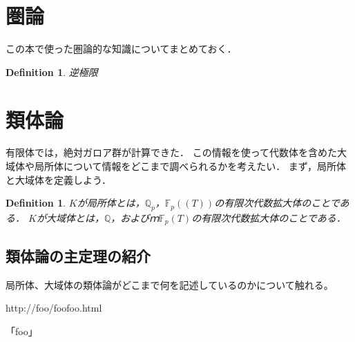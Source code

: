 \documentclass{ujarticle}
\newtheorem{dfn}[thm]{Definition}
\begin{document}
\section{圏論}
この本で使った圏論的な知識についてまとめておく．

\begin{dfn}
 逆極限
\end{dfn}


\section{類体論}
\label{sub:局所体体}
有限体では，絶対ガロア群が計算できた．
この情報を使って代数体を含めた大域体や局所体について情報をどこまで調べられるかを考えたい．
まず，局所体と大域体を定義しよう．

\begin{dfn}
 $K$が局所体とは，$\mathbb{Q}_p$，$\mathbb{F}_p((T))$の有限次代数拡大体のことである．
 $K$が大域体とは，$\mathbb{Q}$，およびｍ$\mathbb{F}_p(T)$の有限次代数拡大体のことである．
\end{dfn}




\subsection{類体論の主定理の紹介}
\label{sub:類体論の主定理の紹介}
局所体、大域体の類体論がどこまで何を記述しているのかについて触れる。

\begin{thebibliography}{最大文献数}
 http://foo/foofoo.html

「foo」
\end{thebibliography}
\end{document}
